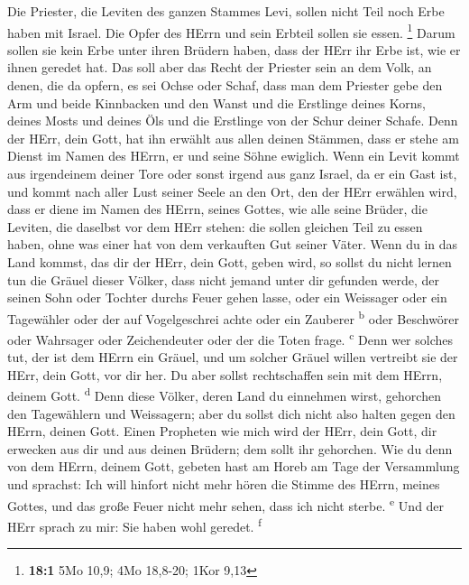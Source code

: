  Die Priester, die Leviten des ganzen Stammes Levi, sollen
nicht Teil noch Erbe haben mit Israel. Die Opfer des HErrn und sein
Erbteil sollen sie essen. \footnote{\textbf{18:1} 5Mo 10,9; 4Mo 18,8-20;
  1Kor 9,13}  Darum sollen sie kein Erbe unter ihren
Brüdern haben, dass der HErr ihr Erbe ist, wie er ihnen geredet hat.
 Das soll aber das Recht der Priester sein an dem Volk, an
denen, die da opfern, es sei Ochse oder Schaf, dass man dem Priester
gebe den Arm und beide Kinnbacken und den Wanst  und die
Erstlinge deines Korns, deines Mosts und deines Öls und die Erstlinge
von der Schur deiner Schafe.  Denn der HErr, dein Gott,
hat ihn erwählt aus allen deinen Stämmen, dass er stehe am Dienst im
Namen des HErrn, er und seine Söhne ewiglich.  Wenn ein
Levit kommt aus irgendeinem deiner Tore oder sonst irgend aus ganz
Israel, da er ein Gast ist, und kommt nach aller Lust seiner Seele an
den Ort, den der HErr erwählen wird,  dass er diene im
Namen des HErrn, seines Gottes, wie alle seine Brüder, die Leviten, die
daselbst vor dem HErr stehen:  die sollen gleichen Teil zu
essen haben, ohne was einer hat von dem verkauften Gut seiner Väter.
 Wenn du in das Land kommst, das dir der HErr, dein Gott,
geben wird, so sollst du nicht lernen tun die Gräuel dieser Völker,
 dass nicht jemand unter dir gefunden werde, der seinen
Sohn oder Tochter durchs Feuer gehen lasse, oder ein Weissager oder ein
Tagewähler oder der auf Vogelgeschrei achte oder ein Zauberer
\textsuperscript{b}  oder Beschwörer oder Wahrsager oder
Zeichendeuter oder der die Toten frage. \textsuperscript{c}
 Denn wer solches tut, der ist dem HErrn ein Gräuel, und
um solcher Gräuel willen vertreibt sie der HErr, dein Gott, vor dir her.
 Du aber sollst rechtschaffen sein mit dem HErrn, deinem
Gott. \textsuperscript{d}  Denn diese Völker, deren Land
du einnehmen wirst, gehorchen den Tagewählern und Weissagern; aber du
sollst dich nicht also halten gegen den HErrn, deinen Gott.
 Einen Propheten wie mich wird der HErr, dein Gott, dir
erwecken aus dir und aus deinen Brüdern; dem sollt ihr gehorchen.
 Wie du denn von dem HErrn, deinem Gott, gebeten hast am
Horeb am Tage der Versammlung und sprachst: Ich will hinfort nicht mehr
hören die Stimme des HErrn, meines Gottes, und das große Feuer nicht
mehr sehen, dass ich nicht sterbe. \textsuperscript{e} 
Und der HErr sprach zu mir: Sie haben wohl geredet. \textsuperscript{f}
